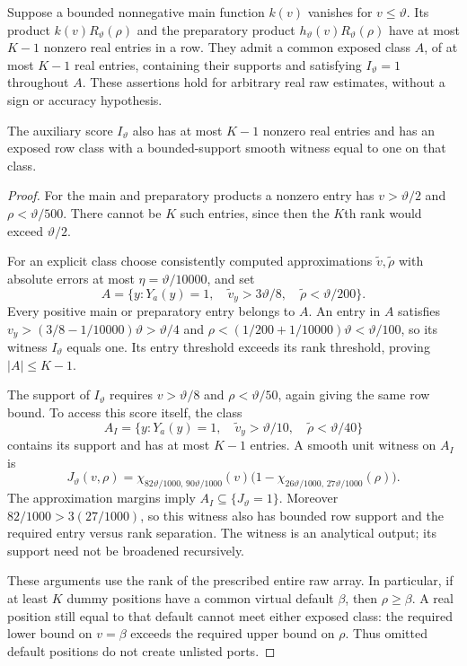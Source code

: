 \begin{lemma}
\label{lem:atom-margins}
Suppose a bounded nonnegative main function $k(v)$ vanishes for
$v\le\vartheta$.  Its product $k(v)R_{\vartheta}(\rho)$ and the
preparatory product $h_{\vartheta}(v)R_{\vartheta}(\rho)$ have at most
$K-1$ nonzero real entries in a row.  They admit a common exposed class
$A$, of at most $K-1$ real entries, containing their supports and satisfying
$I_{\vartheta}=1$ throughout $A$.  These assertions hold for arbitrary
real raw estimates, without a sign or accuracy hypothesis.

The auxiliary score $I_{\vartheta}$ also has at most $K-1$ nonzero real
entries and has an exposed row class with a bounded-support smooth
witness equal to one on that class.
\end{lemma}

\begin{proof}
For the main and preparatory products a nonzero entry has
$v>\vartheta/2$ and $\rho<\vartheta/500$.  There cannot be $K$ such
entries, since then the $K$th rank would exceed $\vartheta/2$.

For an explicit class choose consistently computed approximations
$\widetilde v,\widetilde\rho$ with absolute errors at most
$\eta=\vartheta/10000$, and set
\begin{equation}
 A=\{y:Y_a(y)=1,\quad
       \widetilde v_y>3\vartheta/8,\quad
       \widetilde\rho<\vartheta/200\}.
 \label{eq:atom-exposed-class}
\end{equation}
Every positive main or preparatory entry belongs to $A$.  An entry in
$A$ satisfies $v_y>(3/8-1/10000)\vartheta>\vartheta/4$ and
$\rho<(1/200+1/10000)\vartheta<\vartheta/100$, so its witness
$I_{\vartheta}$ equals one.  Its entry threshold exceeds its rank
threshold, proving $|A|\le K-1$.

The support of $I_{\vartheta}$ requires $v>\vartheta/8$ and
$\rho<\vartheta/50$, again giving the same row bound.  To access this
score itself, the class
\[
 A_I=\{y:Y_a(y)=1,\quad
       \widetilde v_y>\vartheta/10,\quad
       \widetilde\rho<\vartheta/40\}
\]
contains its support and has at most $K-1$ entries.  A smooth unit witness
on $A_I$ is
\[
 J_{\vartheta}(v,\rho)=
  \chi_{82\vartheta/1000,\,90\vartheta/1000}(v)
  \bigl(1-\chi_{26\vartheta/1000,\,27\vartheta/1000}(\rho)\bigr).
\]
The approximation margins imply $A_I\subseteq\{J_{\vartheta}=1\}$.
Moreover $82/1000>3(27/1000)$, so this witness also has bounded row
support and the required entry versus rank separation.  The witness is
an analytical output; its support need not be broadened recursively.

These arguments use the rank of the prescribed entire raw array.
In particular, if at least $K$ dummy positions have a common virtual
default $\beta$, then $\rho\ge\beta$.  A real position still equal to
that default cannot meet either exposed class: the required lower bound
on $v=\beta$ exceeds the required upper bound on $\rho$.  Thus omitted
default positions do not create unlisted ports.
\end{proof}

